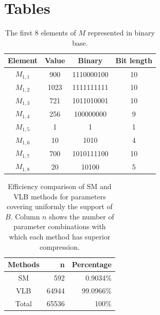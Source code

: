 \documentclass[10pt]{article}
\begin{document}
\section*{Tables}

\begin{table}[h]
 \centering
 \caption{The first 8 elements of $M$ represented in binary base.}
 \begin{tabular}{cccc} 
  \hline 
  Element & Value  & Binary & Bit length\\
  \hline
  $M_{1,1}$ & 900  & 1110000100 & 10\\
  $M_{1,2}$ & 1023 & 1111111111 & 10\\
  $M_{1,3}$ & 721  & 1011010001 & 10\\
  $M_{1,4}$ & 256  & 100000000  & 9\\
  $M_{1,5}$ & 1    & 1          & 1\\
  $M_{1,6}$ & 10   & 1010       & 4\\
  $M_{1,7}$ & 700  & 1010111100 & 10\\
  $M_{1,8}$ & 20   & 10100      & 5\\
  \hline
 \end{tabular}
 \label{tab:01}
\end{table}

\begin{table}[h]
 \centering
 \caption{Efficiency comparison of SM and VLB methods for parameters covering 
uniformly the support of $B$. Column $n$ shows the number of parameter 
combinations with which each method has superior compression.}
 \begin{tabular}{crr}
  \hline 
  Methods  & n   & Percentage \\
  \hline
  SM	   & 592	& 0.9034\% \\
  VLB	   & 64944	& 99.0966\% \\
  \hline
  Total    & 65536	& 100\% \\
  \hline
 \end{tabular}
 \label{tab:02}
\end{table}
\end{document}
